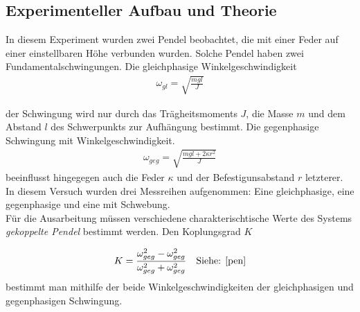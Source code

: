 \documentclass[11pt, a4paper]{article}
\begin{document}
    \subsection{Experimenteller Aufbau und Theorie}

    In diesem Experiment wurden zwei Pendel beobachtet, die mit einer Feder auf einer einstellbaren Höhe
    verbunden wurden. Solche Pendel haben zwei Fundamentalschwingungen. 
    Die gleichphasige Winkelgeschwindigkeit 
    \begin{align}
        \omega_{gl} = \sqrt{\frac{mgl}{J}}
    \end{align}
    
    der Schwingung
    wird nur durch das Trägheitsmoments $J$, die Masse $m$ und dem Abstand $l$ des Schwerpunkts zur Aufhängung bestimmt.
    Die gegenphasige Schwingung mit Winkelgeschwindigkeit. 
    \begin{align}
        \omega_{geg} = \sqrt{\frac{mgl+2\kappa r^2}{J}}
    \end{align}
    beeinflusst hingegegen auch die Feder $\kappa$ und der Befestigunsabstand $r$ letzterer. \\
    In diesem Versuch wurden drei Messreihen aufgenommen: Eine gleichphasige, eine gegenphasige und
    eine mit Schwebung.\\
    Für die Ausarbeitung müssen verschiedene charakterischtische Werte des Systems \textit{gekoppelte Pendel} bestimmt werden.
    Den Koplungsgrad $K$

    \begin{align} \label{Kformel}
        K = \frac{\omega_{geg}^2 - \omega_{geg}^2}{\omega_{geg}^2 + \omega_{geg}^2} \ \ \ \text{Siehe: \cite[Formel (35)]{pen}}
    \end{align}
     bestimmt man mithilfe der beide Winkelgeschwindigkeiten der gleichphasigen und gegenphasigen Schwingung. \\
\end{document}
